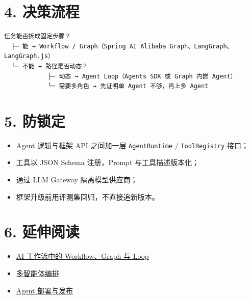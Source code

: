 \documentclass[9pt,a4paper,twocolumn]{ctexart}
\begin{document}
\section*{4. 决策流程}


\begin{lstlisting}
任务能否拆成固定步骤？
  ├─ 能 → Workflow / Graph（Spring AI Alibaba Graph、LangGraph、LangGraph.js）
  └─ 不能 → 路径是否动态？
            ├─ 动态 → Agent Loop（Agents SDK 或 Graph 内嵌 Agent）
            └─ 需要多角色 → 先证明单 Agent 不够，再上多 Agent
\end{lstlisting}



\section*{5. 防锁定}

\begin{itemize}[itemsep=1pt, topsep=2pt]
  \item Agent 逻辑与框架 API 之间加一层 \texttt{AgentRuntime} / \texttt{ToolRegistry} 接口；
  \item 工具以 JSON Schema 注册，Prompt 与工具描述版本化；
  \item 通过 LLM Gateway 隔离模型供应商；
  \item 框架升级前用评测集回归，不直接追新版本。
\end{itemize}


\section*{6. 延伸阅读}

\begin{itemize}[itemsep=1pt, topsep=2pt]
  \item \href{01-Workflow-Graph与Loop.md}{AI 工作流中的 Workflow、Graph 与 Loop}
  \item \href{../02-Agent/03-多智能体编排.md}{多智能体编排}
  \item \href{06-Agent部署与发布.md}{Agent 部署与发布}
\end{itemize}
\end{document}
